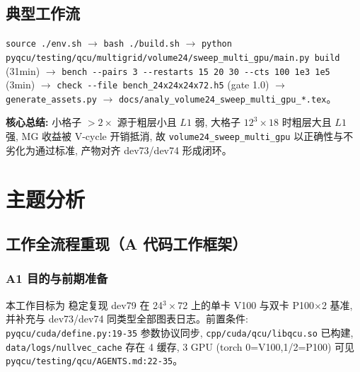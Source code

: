 \documentclass[UTF8]{ctexart}
\begin{document}
\subsection{典型工作流}
\texttt{\nolinkurl{source ./env.sh}} $\to$ \texttt{\nolinkurl{bash ./build.sh}} $\to$ \texttt{\nolinkurl{python pyqcu/testing/qcu/multigrid/volume24/sweep_multi_gpu/main.py build}} (31min) $\to$ \texttt{\nolinkurl{bench --pairs 3 --restarts 15 20 30 --cts 100 1e3 1e5}} (3min) $\to$ \texttt{\nolinkurl{check --file bench_24x24x24x72.h5}} (gate 1.0) $\to$ \texttt{\nolinkurl{generate_assets.py}} $\to$ \texttt{\nolinkurl{docs/analy_volume24_sweep_multi_gpu_*.tex}}。

\begin{ideabox}
\textbf{核心总结:} 小格子 $>2\times$ 源于粗层小且 $L1$ 弱, 大格子 $12^3\times18$ 时粗层大且 $L1$ 强, MG 收益被 V-cycle 开销抵消, 故 \texttt{\nolinkurl{volume24_sweep_multi_gpu}} 以正确性与不劣化为通过标准, 产物对齐 dev73/dev74 形成闭环。
\end{ideabox}

\section{主题分析}
\subsection{工作全流程重现（A 代码工作框架）}

\subsubsection{A1 目的与前期准备}
本工作目标为 \textcolor{struct}{稳定复现 dev79 在 24$^3\times$72 上的单卡 V100 与双卡 P100$\times$2 基准, 并补充与 dev73/dev74 同类型全部图表日志}。前置条件: \texttt{\nolinkurl{pyqcu/cuda/define.py:19-35}} 参数协议同步, \texttt{\nolinkurl{cpp/cuda/qcu/libqcu.so}} 已构建, \texttt{\nolinkurl{data/logs/nullvec_cache}} 存在 4 缓存, 3 GPU (torch 0=V100,1/2=P100) 可见 \textcolor{evidence}{\texttt{\nolinkurl{pyqcu/testing/qcu/AGENTS.md:22-35}}}。
\end{document}

